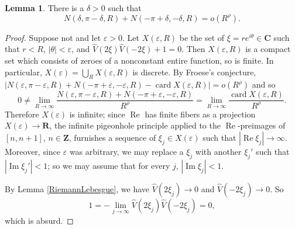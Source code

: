 \documentclass[12pt]{report}
\newcommand{\ZZ}{\mathbf{Z}}
\newcommand{\RR}{\mathbf{R}}
\newcommand{\CC}{\mathbf{C}}
\DeclareMathOperator{\card}{card}
\renewcommand{\Re}{\operatorname{Re}}
\renewcommand{\Im}{\operatorname{Im}}
\theoremstyle{definition}
\newtheorem{lemma}[theorem]{Lemma}
\begin{document}
\begin{lemma}
\label{delta lower bound}
There is a $\delta > 0$ such that
$$N(\delta, \pi - \delta, R) + N(-\pi + \delta, -\delta, R) = o(R^\rho).$$
\end{lemma}
\begin{proof}
Suppose not and let $\varepsilon > 0$.
Let $X(\varepsilon, R)$ be the set of $\xi = re^{i\theta} \in \CC$ such that $r < R$, $|\theta| < \varepsilon$, and $\hat V(2\xi) \hat V(-2\xi) + 1 = 0$. Then $X(\varepsilon, R)$ is a compact set which consists of zeroes of a nonconstant entire function, so is finite. In particular, $X(\varepsilon) = \bigcup_R X(\varepsilon, R)$ is discrete. By Froese's conjecture,
$|N(\varepsilon, \pi - \varepsilon, R) + N(-\pi + \varepsilon, -\varepsilon, R) - \card X(\varepsilon, R)| = o(R^\rho)$ and so
$$0 \neq \lim_{R \to \infty} \frac{N(\varepsilon, \pi - \varepsilon, R) + N(-\pi + \varepsilon, -\varepsilon, R)}{R^\rho} = \lim_{R \to \infty} \frac{\card X(\varepsilon, R)}{R^\rho}.$$
Therefore $X(\varepsilon)$ is infinite; since $\Re$ has finite fibers as a projection $X(\varepsilon) \to \RR$, the infinite pigeonhole principle applied to the $\Re$-preimages of $[n, n + 1]$, $n \in \ZZ$, furnishes a sequence of $\xi_j \in X(\varepsilon)$ such that $|\Re \xi_j| \to \infty$.
Moreover, since $\varepsilon$ was arbitrary, we may replace a $\xi_j$ with another $\xi_j'$ such that $|\Im \xi_j'| < 1$; so we may assume that for every $j$, $|\Im \xi_j| < 1$.

By Lemma \ref{RiemannLebesgue}, we have $\hat V(2\xi_j) \to 0$ and $\hat V(-2\xi_j) \to 0$. So
$$1 = -\lim_{j \to \infty} \hat V(2\xi_j) \hat V(-2\xi_j) = 0,$$
which is absurd.
\end{proof}
\end{document}
